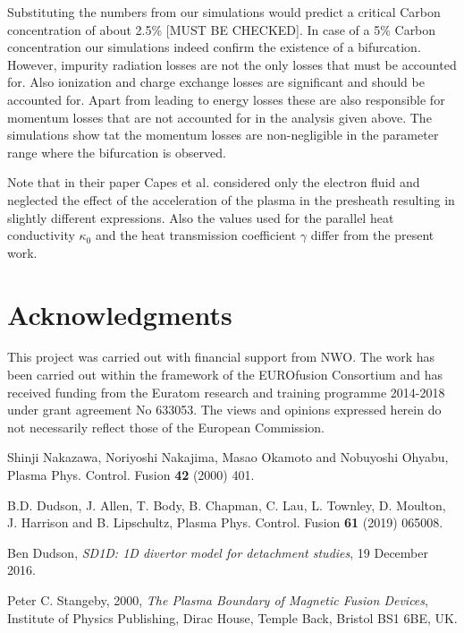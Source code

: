 \documentclass[amsmath,amssymb,a4]{revtex4}
\begin{document}
{\begin{equation}
\end{equation}
Substituting the numbers from our simulations would predict a critical Carbon concentration of about 2.5\% [MUST BE CHECKED]. In case of a 5\% Carbon concentration our simulations indeed confirm the existence of a bifurcation. However, impurity radiation losses are not the only losses that must be accounted for. Also ionization and charge exchange losses are significant and should be accounted for. Apart from leading to energy losses these are also responsible for momentum losses that are not accounted for in the analysis given above. The simulations show tat the momentum losses are non-negligible in the parameter range where the bifurcation is observed.

Note that in their paper Capes et al. considered only the electron fluid and neglected the effect of the acceleration of the plasma in the presheath resulting in slightly different expressions. Also the values used for the parallel heat conductivity $\kappa_0$ and the heat transmission coefficient $\gamma$ differ from the present work.

\section*{Acknowledgments}
\noindent This project was carried out with financial support from NWO. The work has been carried out within the framework of the EUROfusion Consortium and has received funding from the Euratom research and training programme 2014-2018 under grant agreement No 633053. The views and opinions expressed herein do not necessarily reflect those of the European Commission.

\begin{thebibliography}{99}
Shinji Nakazawa, Noriyoshi Nakajima, Masao Okamoto and Nobuyoshi Ohyabu, Plasma Phys. Control. Fusion {\bf 42} (2000) 401.

B.D. Dudson, J. Allen, T. Body, B. Chapman, C. Lau, L. Townley, D. Moulton, J. Harrison and B. Lipschultz, Plasma Phys. Control. Fusion {\bf 61} (2019) 065008.

Ben Dudson, {\it SD1D: 1D divertor model for detachment studies}, 19 December 2016.

Peter C. Stangeby, 2000, {\it The Plasma Boundary of Magnetic Fusion Devices}, Institute of Physics Publishing, Dirac House, Temple Back, Bristol BS1 6BE,
UK.


\end{thebibliography}}
\end{document}
